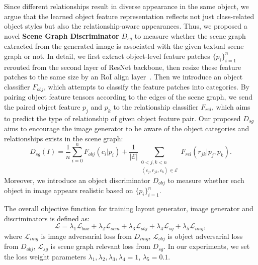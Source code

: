 Since different relationships result in diverse appearance in the same object, we argue that the learned object feature representation reflects not just class-related object styles but also the relationship-aware appearances. Thus, we proposed a novel \textbf{Scene Graph Discriminator} $D_{sg}$ to measure whether the scene graph extracted from the generated image is associated with the given textual scene graph or not. In detail, we first extract object-level feature patches $\{p_i\}_{i=1}^n$ rerouted from the second layer of ResNet backbone, then resize these feature patches to the same size by an RoI align layer~\cite{he2017mask}. Then we introduce an object classifier $F_{obj}$, which attempts to classify the feature patches into categories. By pairing object feature tensors according to the edges of the scene graph, we send the paired object feature $p_j$ and $p_k$ to the relationship classifier $F_{rel}$, which aims to predict the type of relationship of given object feature pair. Our proposed $D_{sg}$ aims to encourage the image generator to be aware of the object categories and relationships exists in the scene graph:
\begin{equation}
    D_{sg}(I)\!=\!\frac{1}{n}\sum_{i = 0}^{n}F_{obj}(c_i|p_i)+\frac{1}{|\mathcal{E}|}\!\sum_{\substack{0<j,k<n \\ \left \langle c_j, r_{jk}, c_k \right \rangle\in\mathcal{E}}}\!F_{rel}(r_{jk}|p_j,p_k).
\end{equation}
Moreover, we introduce an object discriminator $D_{obj}$ to measure whether each object in image appears realistic based on $\{p_i\}_{i=1}^n$.

The overall objective function for training layout generator, image generator and discriminators is defined as:
\begin{equation}
    \mathcal{L} = \lambda_{1}\mathcal{L}_{box} + \lambda_{2}\mathcal{L}_{scm} +  \lambda_{3}\mathcal{L}_{obj} + \lambda_{4}\mathcal{L}_{sg} + \lambda_{5}\mathcal{L}_{img},
\end{equation}
where $\mathcal{L}_{img}$ is image adversarial loss from $D_{img}$,  $\mathcal{L}_{obj}$ is object adversarial loss from $D_{obj}$, $\mathcal{L}_{sg}$ is scene graph relevant loss from $D_{sg}$. In our experiments, we set the loss weight parameters $\lambda_{1},\lambda_{2},\lambda_{3},\lambda_{4}=1$, $\lambda_{5} = 0.1$.

